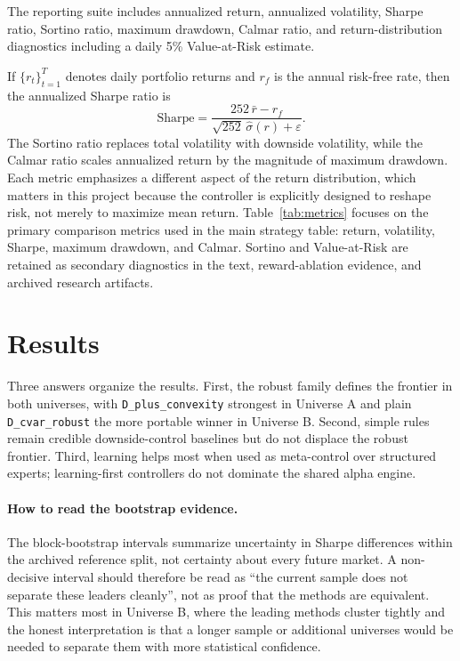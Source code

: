 \documentclass[10pt,twocolumn]{article}
\begin{document}
The reporting suite includes annualized return, annualized volatility, Sharpe
ratio, Sortino ratio, maximum drawdown, Calmar ratio, and return-distribution
diagnostics including a daily 5\% Value-at-Risk estimate.

If $\{r_t\}_{t=1}^T$ denotes daily portfolio returns and $r_f$ is the annual
risk-free rate, then the annualized Sharpe ratio is
\[
\text{Sharpe} = \frac{252 \, \bar{r} - r_f}{\sqrt{252}\,\hat{\sigma}(r) + \varepsilon}.
\]
The Sortino ratio replaces total volatility with downside volatility, while the
Calmar ratio scales annualized return by the magnitude of maximum drawdown. Each
metric emphasizes a different aspect of the return distribution, which matters
in this project because the controller is explicitly designed to reshape risk,
not merely to maximize mean return. Table~\ref{tab:metrics} focuses on the
primary comparison metrics used in the main strategy table: return, volatility,
Sharpe, maximum drawdown, and Calmar. Sortino and Value-at-Risk are retained as
secondary diagnostics in the text, reward-ablation evidence, and archived
research artifacts.

\section{Results}

Three answers organize the results. First, the robust family defines the
frontier in both universes, with \texttt{D\_plus\_convexity} strongest in
Universe A and plain \texttt{D\_cvar\_robust} the more portable winner in
Universe B. Second, simple rules remain credible downside-control baselines but
do not displace the robust frontier. Third, learning helps most when used as
meta-control over structured experts; learning-first controllers do not
dominate the shared alpha engine.

\paragraph{How to read the bootstrap evidence.}
The block-bootstrap intervals summarize uncertainty in Sharpe differences within
the archived reference split, not certainty about every future market. A
non-decisive interval should therefore be read as ``the current sample does not
separate these leaders cleanly'', not as proof that the methods are equivalent.
This matters most in Universe B, where the leading methods cluster tightly and
the honest interpretation is that a longer sample or additional universes would
be needed to separate them with more statistical confidence.
\end{document}
